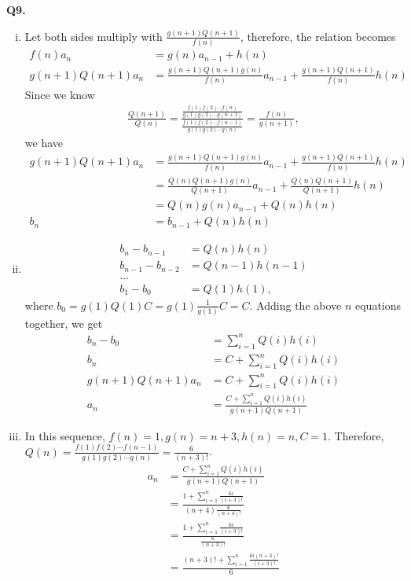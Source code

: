 \documentclass{article}[12pt]
\begin{document}
\noindent \textbf{Q9.}
\begin{enumerate}[(i)]
\item Let both sides multiply with $\frac{g(n+1)Q(n+1)}{f(n)}$, therefore, the relation becomes
\begin{align*}
f(n) a_{n}&=g(n) a_{n-1}+h(n)\\
g(n+1)Q(n+1) a_n&=\frac{g(n+1)Q(n+1)g(n)}{f(n)}a_{n-1}+\frac{g(n+1)Q(n+1)}{f(n)}h(n)
\end{align*}
Since we know 
\begin{align*}
\frac{Q(n+1)}{Q(n)}=\frac{\frac{f(1) f(2) \cdots f(n)}{g(1) g(2) \cdots g(n+1)}}{\frac{f(1) f(2) \cdots f(n-1)}{g(1) g(2) \cdots g(n)}}=\frac{f(n)}{g(n+1)}, 
\end{align*}
we have 
\begin{align*}
g(n+1)Q(n+1) a_n&=\frac{g(n+1)Q(n+1)g(n)}{f(n)}a_{n-1}+\frac{g(n+1)Q(n+1)}{f(n)}h(n)\\
&=\frac{Q(n)Q(n+1)g(n)}{Q(n+1)}a_{n-1}+\frac{Q(n)Q(n+1)}{Q(n+1)}h(n)\\
&=Q(n)g(n)a_{n-1}+Q(n)h(n)\\
b_{n}&=b_{n-1}+Q(n) h(n)
\end{align*}
\item \begin{align*}
b_n-b_{n-1}&=Q(n)h(n)\\
b_{n-1}-b_{n-2}&=Q(n-1)h(n-1)\\
\dots\\
b_1-b_{0}&=Q(1)h(1),
\end{align*}
where $b_0=g(1)Q(1)C=g(1)\frac{1}{g(1)}C=C$. Adding the above $n$ equations together, we get
\begin{align*}
b_n-b_0&=\sum_{i=1}^{n} Q(i) h(i)\\
b_n&=C+\sum_{i=1}^{n} Q(i) h(i)\\
g(n+1) Q(n+1) a_{n}&=C+\sum_{i=1}^{n} Q(i) h(i)\\
a_{n}&=\frac{C+\sum_{i=1}^{n} Q(i) h(i)}{g(n+1) Q(n+1)}
\end{align*}
\item In this sequence, $f(n)=1,g(n)=n+3,h(n)=n,C=1$. Therefore, $Q(n)=\frac{f(1) f(2) \cdots f(n-1)}{g(1) g(2) \cdots g(n)}=\frac{6}{(n+3)!}$.
\begin{align*}
a_{n}&=\frac{C+\sum_{i=1}^{n} Q(i) h(i)}{g(n+1) Q(n+1)}\\
&=\frac{1+\sum_{i=1}^{n} \frac{6i}{(i+3)!} }{(n+4) \frac{6}{(n+4)!}}\\
&=\frac{1+\sum_{i=1}^{n} \frac{6i}{(i+3)!} }{\frac{6}{(n+3)!}}\\
&=\frac{(n+3)!+\sum_{i=1}^{n} \frac{6i(n+3)!}{(i+3)!} }{6}
\end{align*}
\end{enumerate}













\end{document}
